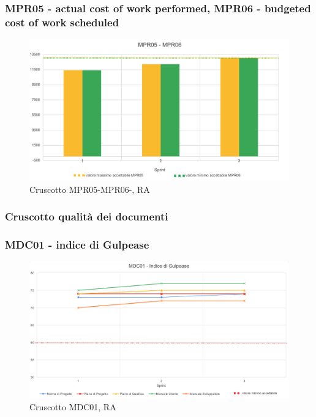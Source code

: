\subsubsection*{MPR05 - actual cost of work performed, MPR06 - budgeted cost of work scheduled}

\begin{figure}[H] 
    \centering
    \includegraphics[scale = 0.7]{immagini/ImmRA/MPR0506.png}
    \caption{Cruscotto MPR05-MPR06-, RA}
\end{figure}

\subsubsection{Cruscotto qualità dei documenti}
\subsubsection*{MDC01 - indice di Gulpease}

\begin{figure}[H] 
    \centering
    \includegraphics[scale = 0.6]{immagini/ImmRA/MDC01.png}
    \caption{Cruscotto MDC01, RA}
\end{figure}

